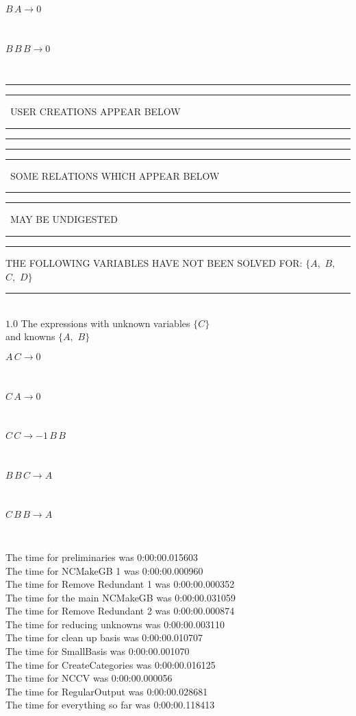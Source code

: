 \documentclass[rep10,leqno]{report}
\begin{document}
\begin{minipage}{6in}
$
B\,
 A\rightarrow 0
$
\end{minipage}\medskip \\
\begin{minipage}{6in}
$
B\,
 B\,
 B\rightarrow 0
$
\end{minipage}\\
\rule[2pt]{6in}{1pt}\hfil\break
\rule[2.5pt]{1.701in}{1pt}
\ USER CREATIONS APPEAR BELOW\ 
\rule[2.5pt]{1.701in}{1pt}\hfil\break
\rule[2pt]{6in}{1pt}\hfil\break
\rule[2pt]{6in}{4pt}\hfil\break
\rule[2pt]{1.45in}{4pt}
\ SOME RELATIONS WHICH APPEAR BELOW\ 
\rule[2pt]{1.45in}{4pt}\hfil\break
\rule[2pt]{2.18in}{4pt}
\ MAY BE UNDIGESTED\ 
\rule[2pt]{2.18in}{4pt}\hfil\break
\rule[2pt]{6in}{4pt}\hfil\break
THE FOLLOWING VARIABLES HAVE NOT BEEN SOLVED FOR:\hfil\break
$\{A,
$ $
B,
$ $
C,
$ $
D\}$
\smallskip\\
\rule[3pt]{6in}{.7pt}\\
$1.0$  The expressions with unknown variables $\{C\}$\\
and knowns $\{A,
$ $
B\}$\smallskip\\
\begin{minipage}{6in}
$
A\,
 C\rightarrow 0
$
\end{minipage}\medskip \\
\begin{minipage}{6in}
$
C\,
 A\rightarrow 0
$
\end{minipage}\medskip \\
\begin{minipage}{6in}
$
C\,
 C\rightarrow -1\,
 B\,
 B
$
\end{minipage}\medskip \\
\begin{minipage}{6in}
$
B\,
 B\,
 C\rightarrow A
$
\end{minipage}\medskip \\
\begin{minipage}{6in}
$
C\,
 B\,
 B\rightarrow A
$
\end{minipage}\\
\vspace{10pt}

\noindent
The time for preliminaries was 0:00:00.015603\\
The time for NCMakeGB 1 was 0:00:00.000960\\
The time for Remove Redundant 1 was 0:00:00.000352\\
The time for the main NCMakeGB was 0:00:00.031059\\
The time for Remove Redundant 2 was 0:00:00.000874\\
The time for reducing unknowns was 0:00:00.003110\\
The time for clean up basis was 0:00:00.010707\\
The time for SmallBasis was 0:00:00.001070\\
The time for CreateCategories was 0:00:00.016125\\
The time for NCCV was 0:00:00.000056\\
The time for RegularOutput was 0:00:00.028681\\
The time for everything so far was 0:00:00.118413\\
\end{document}
